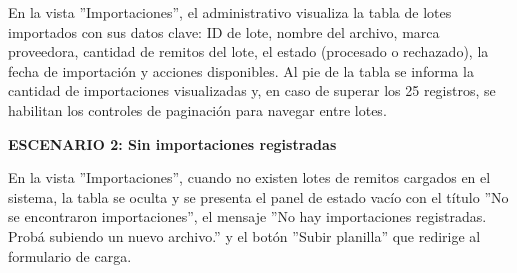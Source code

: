 \documentclass[a4paper,9pt]{article}
\begin{document}
\begin{tcolorbox}
{En la vista ''Importaciones'', el administrativo visualiza la tabla de lotes importados con sus datos clave: ID de lote, nombre del archivo, marca proveedora, cantidad de remitos del lote, el estado (procesado o rechazado), la fecha de importación y acciones disponibles. Al pie de la tabla se informa la cantidad de importaciones visualizadas y, en caso de superar los 25 registros, se habilitan los controles de paginación para navegar entre lotes.\par\vspace{2.5pt}
\noindent\textbf{\textcolor{secondarydark}{ESCENARIO 2:  Sin importaciones registradas}}\par\vspace{1pt}
En la vista ''Importaciones'', cuando no existen lotes de remitos cargados en el sistema, la tabla se oculta y se presenta el panel de estado vacío con el título ''No se encontraron importaciones'', el mensaje ''No hay importaciones registradas. Probá subiendo un nuevo archivo.'' y el botón ''Subir planilla'' que redirige al formulario de carga.\par\vspace{2.5pt}
}\par
\end{tcolorbox}
\end{document}
